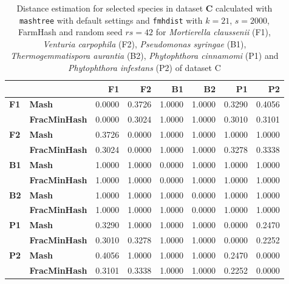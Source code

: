 \begin{table}[]
  \centering
  \begin{tabular}{@{}llrrrrrr@{}}
  \toprule
              &                      & \textbf{F1} & \textbf{F2} & \textbf{B1} & \textbf{B2} & \textbf{P1} & \textbf{P2} \\ \midrule
  \textbf{F1} & \textbf{Mash}        & 0.0000      & 0.3726      & 1.0000      & 1.0000      & 0.3290      & 0.4056      \\
  \textbf{}   & \textbf{FracMinHash} & 0.0000      & 0.3024      & 1.0000      & 1.0000      & 0.3010      & 0.3101      \\ \midrule
  \textbf{F2} & \textbf{Mash}        & 0.3726      & 0.0000      & 1.0000      & 1.0000      & 1.0000      & 1.0000      \\
  \textbf{}   & \textbf{FracMinHash} & 0.3024      & 0.0000      & 1.0000      & 1.0000      & 0.3278      & 0.3338      \\ \midrule
  \textbf{B1} & \textbf{Mash}        & 1.0000      & 1.0000      & 0.0000      & 1.0000      & 1.0000      & 1.0000      \\
  \textbf{}   & \textbf{FracMinHash} & 1.0000      & 1.0000      & 0.0000      & 1.0000      & 1.0000      & 1.0000      \\ \midrule
  \textbf{B2} & \textbf{Mash}        & 1.0000      & 1.0000      & 1.0000      & 0.0000      & 1.0000      & 1.0000      \\
  \textbf{}   & \textbf{FracMinHash} & 1.0000      & 1.0000      & 1.0000      & 0.0000      & 1.0000      & 1.0000      \\ \midrule
  \textbf{P1} & \textbf{Mash}        & 0.3290      & 1.0000      & 1.0000      & 1.0000      & 0.0000      & 0.2470      \\
  \textbf{}   & \textbf{FracMinHash} & 0.3010      & 0.3278      & 1.0000      & 1.0000      & 0.0000      & 0.2252      \\ \midrule
  \textbf{P2} & \textbf{Mash}        & 0.4056      & 1.0000      & 1.0000      & 1.0000      & 0.2470      & 0.0000      \\
  \textbf{}   & \textbf{FracMinHash} & 0.3101      & 0.3338      & 1.0000      & 1.0000      & 0.2252      & 0.0000      \\ \bottomrule
  \end{tabular}
  \caption[Distance estimation for selected species in dataset \textbf{C}
  calculated with \texttt{mashtree} and \texttt{fmhdist}]{Distance estimation
  for selected species in dataset \textbf{C} calculated with \texttt{mashtree}
  with default settings and \texttt{fmhdist} with $k=21$, $s=2000$, FarmHash and
  random seed $rs=42$ for \textit{Mortierella claussenii} (F1), \textit{Venturia
  carpophila} (F2), \textit{Pseudomonas syringae} (B1),
  \textit{Thermogemmatispora aurantia} (B2), \textit{Phytophthora cinnamomi}
  (P1) and \textit{Phytophthora infestans} (P2) of dataset C}
  \label{ta:avocadoDistance}
\end{table}

